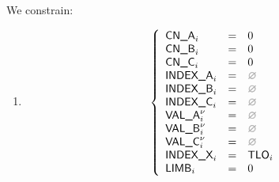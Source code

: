 \begin{center}
\end{center}

We constrain:
\begin{enumerate}
	\item 
\[
	\left\{
	\begin{array}{lclr}
		\cnA      _{i}       & = & 0            \\
		\cnB      _{i}       & = & 0            \\
		\cnC      _{i}       & = & 0            \\
		\indexA   _{i}       & = & \nothing     \\
		\indexB   _{i}       & = & \nothing     \\
		\indexC   _{i}       & = & \nothing     \\
		\valA     _{i}\new{} & = & \nothing     \\
		\valB     _{i}\new{} & = & \nothing     \\
		\valC     _{i}\new{} & = & \nothing     \\
		\indexX   _{i}       & = & \tlo_{i}     \\
		\limb     _{i}       & = & 0            \\
	\end{array}
	\right.
\]
\end{enumerate}
